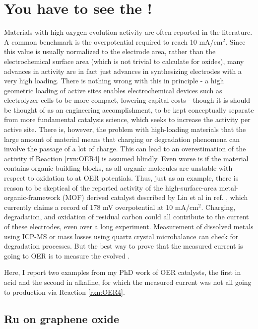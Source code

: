 \section{You have to see the !}\label{sec:see_the_O2}

Materials with high oxygen evolution activity are often reported in the literature. A common benchmark is the overpotential required to reach 10 mA/cm$^2$\cite{McCrory2013, Kibsgaard2019}. Since this value is usually normalized to the electrode area, rather than the electrochemical surface area (which is not trivial to calculate for oxides), many advances in activity are in fact just advances in synthesizing electrodes with a very high loading\cite{Kibsgaard2019}. There is nothing wrong with this in principle - a high geometric loading of active sites enables electrochemical devices such as electrolyzer cells to be more compact, lowering capital costs - though it is should be thought of as an engineering accomplishment, to be kept conceptually separate from more fundamental catalysis science, which seeks to increase the activity per active site\cite{Seh2017}. There is, however, the problem with high-loading materials that the large amount of material means that charging or degradation phenomena can involve the passage of a lot of charge. This can lead to an overestimation of the activity if Reaction \ref{rxn:OER4} is assumed blindly. Even worse is if the material contains organic building blocks, as all organic molecules are unstable with respect to oxidation to  at OER potentials. Thus, just as an example, there is reason to be skeptical of the reported activity of the high-surface-area metal-organic-framework (MOF) derived  catalyst described by Lin et al in ref. , which currently claims a record\cite{Kibsgaard2019} of 178 mV overpotential at 10 mA/cm$^2$. Charging, degradation, and oxidation of residual carbon could all contribute to the current of these electrodes, even over a long experiment. Measurement of dissolved metals using ICP-MS or mass losses using quartz crystal microbalance can check for degradation processes\cite{Frydendal2014}. But the best way to prove that the measured current is going to OER is to measure the evolved . 

Here, I report two examples from my PhD work of OER catalysts, the first in acid and the second in alkaline, for which the measured current was not all going to  production via Reaction \ref{rxn:OER4}.

\subsection{Ru on graphene oxide}

